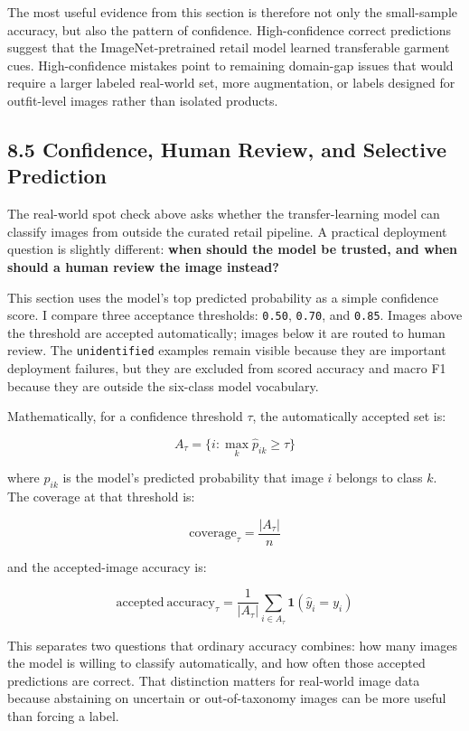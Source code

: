 \documentclass[11pt]{article}
\begin{document}
The most useful evidence from this section is therefore not only the
small-sample accuracy, but also the pattern of confidence.
High-confidence correct predictions suggest that the ImageNet-pretrained
retail model learned transferable garment cues. High-confidence mistakes
point to remaining domain-gap issues that would require a larger labeled
real-world set, more augmentation, or labels designed for outfit-level
images rather than isolated products.

    \subsection{8.5 Confidence, Human Review, and Selective
Prediction}\label{confidence-human-review-and-selective-prediction}

The real-world spot check above asks whether the transfer-learning model
can classify images from outside the curated retail pipeline. A
practical deployment question is slightly different: \textbf{when should
the model be trusted, and when should a human review the image instead?}

This section uses the model's top predicted probability as a simple
confidence score. I compare three acceptance thresholds: \texttt{0.50},
\texttt{0.70}, and \texttt{0.85}. Images above the threshold are
accepted automatically; images below it are routed to human review. The
\texttt{unidentified} examples remain visible because they are important
deployment failures, but they are excluded from scored accuracy and
macro F1 because they are outside the six-class model vocabulary.

Mathematically, for a confidence threshold \(\tau\), the automatically
accepted set is:

\[
A_\tau = \{i : \max_k \hat{p}_{ik} \ge \tau\}
\]

where \(\hat{p}_{ik}\) is the model's predicted probability that image
\(i\) belongs to class \(k\). The coverage at that threshold is:

\[
\mathrm{coverage}_\tau = \frac{|A_\tau|}{n}
\]

and the accepted-image accuracy is:

\[
\mathrm{accepted\ accuracy}_\tau = \frac{1}{|A_\tau|} \sum_{i \in A_\tau} \mathbf{1}(\hat{y}_i = y_i)
\]

This separates two questions that ordinary accuracy combines: how many
images the model is willing to classify automatically, and how often
those accepted predictions are correct. That distinction matters for
real-world image data because abstaining on uncertain or out-of-taxonomy
images can be more useful than forcing a label.
\end{document}
